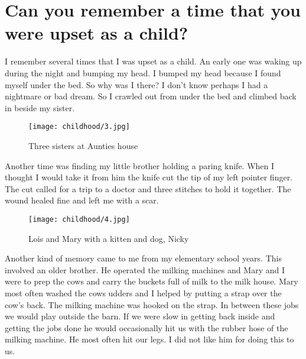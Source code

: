 \section{Can you remember a time that you were upset as a child?}
I remember several times that I was upset as a child.
An early one was waking up during the night and bumping my head.
I bumped my head because I found myself under the bed.
So why was I there? I don't know perhaps I had a nightmare or bad dream.
So I crawled out from under the bed and climbed back in beside my sister.
\begin{figure}
\centering
\texttt{[image: childhood/3.jpg]}
\caption{
Three sisters at Aunties house
}
\end{figure}

Another time was finding my little brother holding a paring knife.
When I thought I would take it from him the knife cut the tip of my left pointer finger.
The cut called for a trip to a doctor and three stitches to hold it together.
The wound healed fine and left me with a scar.
\begin{figure}
\centering
\texttt{[image: childhood/4.jpg]}
\caption{
Lois and Mary with a kitten and dog, Nicky
}
\end{figure}

Another kind of memory came to me from my elementary school years.
This involved an older brother.
He operated the milking machines and Mary and I were to prep the cows and carry the buckets full of milk to the milk house.
Mary most often washed the cows udders and I helped by putting a strap over the cow's back.
The milking machine was hooked on the strap.
In between these jobs we would play outside the barn.
If we were slow in getting back inside and getting the jobs done he would occasionally hit us with the rubber hose of the milking machine.
He most often hit our legs.
I did not like him for doing this to us.

